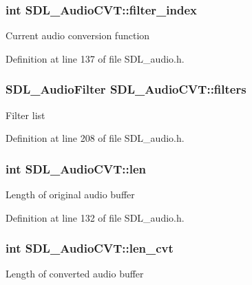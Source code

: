 \hypertarget{structSDL__AudioCVT_a35093b3ad3331c17416c593a76012b63}{
\subsubsection[{filter\+\_\+index}]{\setlength{\rightskip}{0pt plus 5cm}int S\+D\+L\+\_\+\+Audio\+C\+V\+T\+::filter\+\_\+index}}\label{structSDL__AudioCVT_a35093b3ad3331c17416c593a76012b63}
Current audio conversion function 

Definition at line 137 of file S\+D\+L\+\_\+audio.\+h.

\hypertarget{structSDL__AudioCVT_aa9b3c25dcbfc957dd439a34fcd3ff608}{
\subsubsection[{filters}]{\setlength{\rightskip}{0pt plus 5cm}S\+D\+L\+\_\+\+Audio\+Filter S\+D\+L\+\_\+\+Audio\+C\+V\+T\+::filters}}\label{structSDL__AudioCVT_aa9b3c25dcbfc957dd439a34fcd3ff608}
Filter list 

Definition at line 208 of file S\+D\+L\+\_\+audio.\+h.

\hypertarget{structSDL__AudioCVT_aeaeb8c5a63c3ab96471fbfdf412c78ff}{
\subsubsection[{len}]{\setlength{\rightskip}{0pt plus 5cm}int S\+D\+L\+\_\+\+Audio\+C\+V\+T\+::len}}\label{structSDL__AudioCVT_aeaeb8c5a63c3ab96471fbfdf412c78ff}
Length of original audio buffer 

Definition at line 132 of file S\+D\+L\+\_\+audio.\+h.

\hypertarget{structSDL__AudioCVT_a5c60163f34d1947e5b166c23aba9879d}{
\subsubsection[{len\+\_\+cvt}]{\setlength{\rightskip}{0pt plus 5cm}int S\+D\+L\+\_\+\+Audio\+C\+V\+T\+::len\+\_\+cvt}}\label{structSDL__AudioCVT_a5c60163f34d1947e5b166c23aba9879d}
Length of converted audio buffer 

